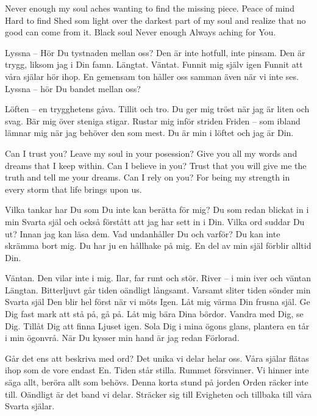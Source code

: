 \startpoem
Never enough
my soul aches
wanting to find the missing piece.
Peace of mind
Hard to find
Shed som light 
over the darkest part of my soul
and realize that no good
can come from it.
Black soul
Never enough
Always aching for
You.
\stoppoem

\startpoem
Lyssna – 
Hör Du tystnaden mellan oss?
Den är inte hotfull, inte pinsam.
Den är trygg, liksom jag i Din famn.
Längtat.
Väntat.
Funnit mig själv igen
Funnit att våra själar hör ihop.
En gemensam ton håller oss samman
även när vi inte ses.
Lyssna – hör Du bandet
mellan oss? 
\stoppoem

\startpoem 
Löften – en trygghetens gåva.
Tillit och tro.
Du ger mig tröst när jag är liten och svag.
Bär mig över steniga stigar.
Rustar mig inför striden
Friden – som ibland lämnar mig
när jag behöver den som mest.
Du är min i löftet
och jag är 
Din. 
\stoppoem

\startpoem
Can I trust you?
Leave my soul in your posession?
Give you all my words and dreams
that I keep within.
Can I believe in you?
Trust that you will give me the truth
and tell me your dreams.
Can I rely on you?
For being my strength in every storm
that life brings upon us. 
\stoppoem

\startpoem
Vilka tankar har Du
som Du inte kan berätta för mig?
Du som redan blickat in i min
Svarta själ
och också förstått att jag har sett in i Din.
Vilka ord suddar Du ut?
Innan jag kan läsa dem.
Vad undanhåller Du och varför?
Du kan inte skrämma bort mig.
Du har ju en hållhake på mig.
En del av min själ förblir alltid
Din.
\stoppoem

\startpoem
Väntan.
Den vilar inte i mig.
Ilar, far runt och stör.
River – i min iver och väntan
Längtan.
Bitterljuvt går tiden oändligt långsamt.
Varsamt sliter tiden sönder min
Svarta själ
Den blir hel först när vi möts
Igen.
Låt mig värma Din frusna själ.
Ge Dig fast mark att stå på, gå på.
Låt mig bära Dina bördor.
Vandra med Dig, se Dig.
Tillåt Dig att finna Ljuset igen.
Sola Dig i mina ögons glans,
plantera en tår i min ögonvrå.
När Du kysser min hand är jag redan
Förlorad.
\stoppoem

\startpoem
Går det ens att beskriva med ord?
Det unika vi delar helar oss.
Våra själar flätas ihop som de vore endast En.
Tiden står stilla.
Rummet försvinner.
Vi hinner inte säga allt, beröra allt som behövs.
Denna korta stund på jorden
Orden räcker inte till.
Oändligt är det band vi delar.
Sträcker sig till Evigheten och tillbaka till våra
Svarta själar.
\stoppoem

